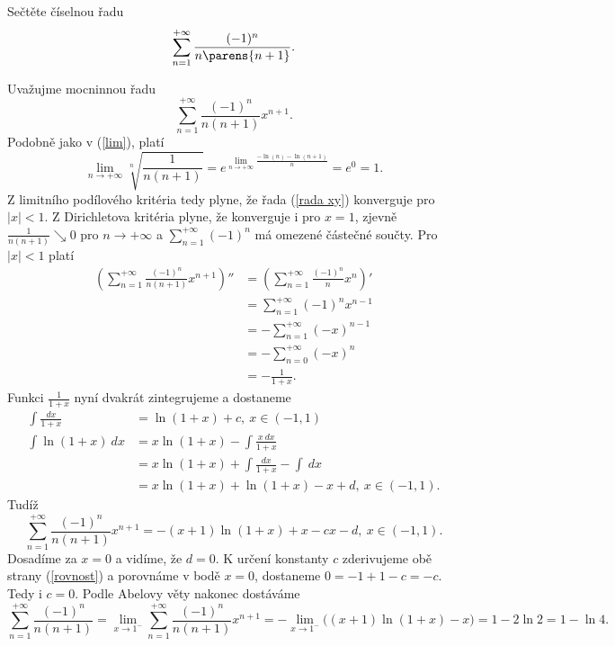 \documentclass[answers]{exam}
\begin{document}
\begin{questions}
  \question
  Sečtěte číselnou řadu
  \begin{equation*}
    \sum_{n = 1}^{+\infty}
		\frac{(-1)^n}{n \parens{n+1}}.
  \end{equation*}
  
  \begin{solution}
		Uva\v zujme mocninnou řadu
		\begin{equation}\label{rada xy}
		\sum_{n=1}^{+\infty}\frac{(-1)^n}{n(n+1)}x^{n+1}. 
		\end{equation}
		Podobn\v e jako v (\ref{lim}), plat\'i 
		$$\lim_{n\to+\infty}\sqrt[n]{\frac{1}{n(n+1)}}=e^{\lim_{n\to+\infty}\frac{-\ln(n)-\ln(n+1)}{n}}=e^0=1.$$
		Z limitn\'iho pod\'ilov\'eho krit\'eria tedy plyne, \v ze \v rada (\ref{rada xy}) konverguje pro $|x|<1$. Z Dirichletova krit\'eria plyne, \v ze konverguje i pro $x=1$, zjevn\v e $\frac{1}{n(n+1)}\searrow 0$ pro $n\to+\infty$ a $\sum_{n=1}^{+\infty}(-1)^n$ m\'a omezen\'e \v c\'aste\v cn\'e sou\v cty. Pro $|x|<1$ platí
		\begin{align*}
		\left(\sum_{n=1}^{+\infty}\frac{(-1)^n}{n(n+1)}x^{n+1}
		\right)''&=\left(\sum_{n=1}^{+\infty}\frac{(-1)^n}{n}x^{n}\right)'\\
		&=\sum_{n=1}^{+\infty}(-1)^nx^{n-1}\\
		&=-\sum_{n=1}^{+\infty}(-x)^{n-1}\\
		&=-\sum_{n=0}^{+\infty}(-x)^{n}\\
		&=-\frac{1}{1+x}.
		\end{align*}
		Funkci $\frac{1}{1+x}$ nyn\'i dvakr\'at zintegrujeme a dostaneme
		\begin{align*}
		\int\frac{dx}{1+x}&=\ln(1+x)+c,\ x\in(-1,1)\\
		\int\ln(1+x)\ dx&=x\ln(1+x)-\int\frac{x\ dx}{1+x}\\
		&=x\ln(1+x)+\int\frac{dx}{1+x}-\int\ dx\\
		&=x\ln(1+x)+\ln(1+x)-x+d,\ x\in(-1,1).
		\end{align*}
		Tud\'i\v z
		\begin{equation}\label{rovnost}
		\sum_{n=1}^{+\infty}\frac{(-1)^n}{n(n+1)}x^{n+1}=-(x+1)\ln(1+x)+x-cx-d,\ x\in(-1,1). 
		\end{equation}
		Dosad\'ime za $x=0$ a vid\'ime, \v ze $d=0$. K ur\v cen\'i konstanty $c$ zderivujeme ob\v e strany (\ref{rovnost})  a porovn\'ame v bod\v e $x=0$, dostaneme $0=-1+1-c=-c$. Tedy i $c=0$. Podle Abelovy věty nakonec dostáváme
		\begin{equation*}
		\sum_{n=1}^{+\infty}\frac{(-1)^n}{n(n+1)}=\lim_{x\to1^-}\sum_{n=1}^{+\infty}\frac{(-1)^n}{n(n+1)}x^{n+1}=-\lim_{x\to1^-}\big((x+1)\ln(1+x)-x\big)=1-2\ln 2=1-\ln 4.
		\end{equation*}  	
  \end{solution}
   
\end{questions}
\end{document}
